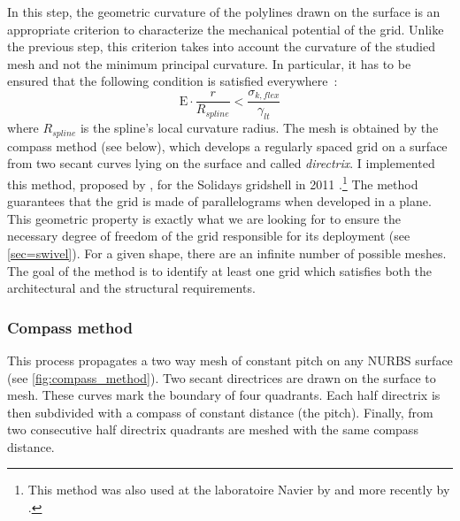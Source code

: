 In this step, the geometric curvature of the polylines drawn on the surface is an appropriate criterion to characterize the mechanical potential of the grid. Unlike the previous step, this criterion takes into account the curvature of the studied mesh and not the minimum principal curvature. In particular, it has to be ensured that the following condition is satisfied everywhere~:
\begin{equation}
	\mathrm{E} \cdot   \frac{r}{R_{spline}}  <   \frac{\sigma_{k,flex}}{\gamma_{lt}}
	\label{eq:crit_2}
\end{equation}
where $R_{spline}$ is the spline’s local curvature radius. The mesh is obtained by the compass method (see below), which develops a regularly spaced grid on a surface from two secant curves lying on the surface and called \emph{directrix}. I implemented this method, proposed by \citet{IL10}, for the Solidays gridshell in 2011 \cite{DuPeloux2011}.\footnote{This method was also used at the laboratoire Navier by  and more recently by .} The method guarantees that the grid is made of parallelograms when developed in a plane. This geometric property is exactly what we are looking for to ensure the necessary degree of freedom of the grid responsible for its deployment (see \cref{sec=swivel}). For a given shape, there are an infinite number of possible meshes. The goal of the method is to identify at least one grid which satisfies both the architectural and the structural requirements.


\subsubsection{Compass method}\label{sec=compass}
This process propagates a two way mesh of constant pitch on any NURBS surface (see \cref{fig:compass_method}). Two secant directrices are drawn on the surface to mesh. These curves mark the boundary of four quadrants. Each half directrix is then subdivided with a compass of constant distance (the pitch). Finally, from two consecutive half directrix quadrants are meshed with the same compass distance.

